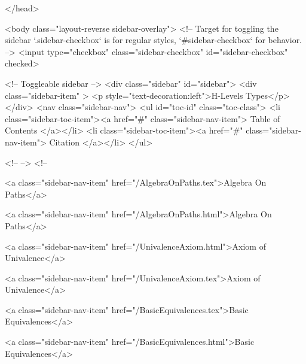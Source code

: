   
</head>




  <body class="layout-reverse sidebar-overlay">
    <!-- Target for toggling the sidebar `.sidebar-checkbox` is for regular
     styles, `#sidebar-checkbox` for behavior. -->
<input type="checkbox" class="sidebar-checkbox" id="sidebar-checkbox" checked>

<!-- Toggleable sidebar -->
<div class="sidebar" id="sidebar">
  <div class="sidebar-item" >
    <p style="text-decoration:left">H-Levels Types</p>
  </div>
  <nav class="sidebar-nav">
    <ul id="toc-id" class="toc-class">
  <li class="sidebar-toc-item"><a href="#" class="sidebar-nav-item"> Table of Contents </a></li>
  <li class="sidebar-toc-item"><a href="#" class="sidebar-nav-item"> Citation </a></li>
</ul>


    <!--  -->
    <!-- 
      
    
      
    
      
    
      
    
      
        
      
    
      
        
          <a class="sidebar-nav-item" href="/AlgebraOnPaths.tex">Algebra On Paths</a>
        
      
    
      
        
          <a class="sidebar-nav-item" href="/AlgebraOnPaths.html">Algebra On Paths</a>
        
      
    
      
        
          <a class="sidebar-nav-item" href="/UnivalenceAxiom.html">Axiom of Univalence</a>
        
      
    
      
        
          <a class="sidebar-nav-item" href="/UnivalenceAxiom.tex">Axiom of Univalence</a>
        
      
    
      
        
          <a class="sidebar-nav-item" href="/BasicEquivalences.tex">Basic Equivalences</a>
        
      
    
      
        
          <a class="sidebar-nav-item" href="/BasicEquivalences.html">Basic Equivalences</a>
        
